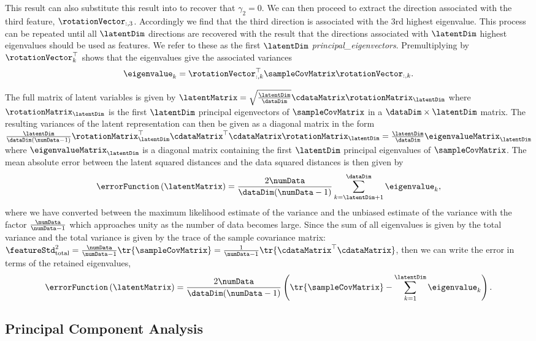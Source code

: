 This result can also substitute this result into
 to recover that $\gamma_2=0$. We can then
proceed to extract the direction associated with the third feature,
$\rotationVector_{:,3}$. Accordingly we find that the third direction
is associated with the 3rd highest eigenvalue. This process can be
repeated until all $\latentDim$ directions are recovered with the
result that the directions associated with $\latentDim$ highest
eigenvalues should be used as features. We refer to these as the first
$\latentDim$ \emph{\gls{principal_eigenvectors}}. Premultiplying
 by $\rotationVector_{k}^\top$ shows
that the eigenvalues give the associated variances
\[
\eigenvalue_{k}=\rotationVector_{:, k}^{\top}\sampleCovMatrix\rotationVector_{:, k}.
\]

The full matrix of latent variables is given by $\latentMatrix =
\sqrt{\frac{\latentDim}{\dataDim}}\cdataMatrix\rotationMatrix_{\latentDim}$ where
$\rotationMatrix_\latentDim$ is the first $\latentDim$ principal
eigenvectors of $\sampleCovMatrix$ in a $\dataDim\times\latentDim$
matrix. The resulting variances of the latent representation can then be given as a diagonal matrix in the form $\frac{\latentDim}{\dataDim(\numData-1)}\rotationMatrix^\top_\latentDim\cdataMatrix^\top \cdataMatrix\rotationMatrix_\latentDim=\frac{\latentDim}{\dataDim}\eigenvalueMatrix_\latentDim$ where $\eigenvalueMatrix_\latentDim$ is a diagonal matrix containing the first $\latentDim$ principal eigenvalues of $\sampleCovMatrix$. The mean absolute error between the latent squared distances and the data squared distances is then given by
\[
\errorFunction\left(\latentMatrix\right)=\frac{2\numData}{\dataDim(\numData-1)}\sum_{k=\latentDim+1}^{\dataDim}\eigenvalue_{k},
\]
where we have converted between the maximum likelihood estimate of the variance and the unbiased estimate of the variance with the factor $\frac{\numData}{\numData -1}$ which approaches unity as the number of data becomes large.
Since the sum of all eigenvalues is given by the total variance and the total variance is given by the trace of the sample covariance matrix: $\featureStd_{\text{total}}^2 = \frac{\numData}{\numData-1}\tr{\sampleCovMatrix} = \frac{1}{\numData-1}\tr{\cdataMatrix^\top\cdataMatrix}$, then we can write the error in terms of the retained eigenvalues,
\[
\errorFunction\left(\latentMatrix\right)=\frac{2\numData}{\dataDim(\numData-1)}\left(\tr{\sampleCovMatrix}-\sum_{k=1}^{\latentDim}\eigenvalue_{k}\right).
\]

\subsection{Principal Component Analysis}

